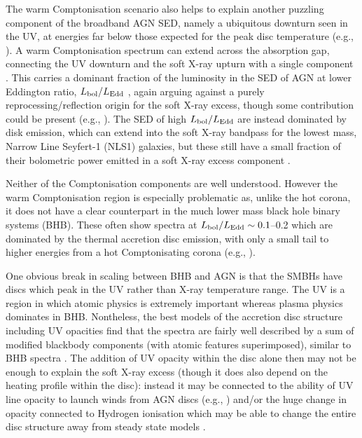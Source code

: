 \documentclass[a4paper,fleqn,usenatbib]{mnras}
\begin{document}
The warm Comptonisation scenario also helps to explain another puzzling
component of the broadband AGN SED, namely a ubiquitous downturn seen
in the UV, at energies far below those expected for the peak disc
temperature (e.g., \citealt{zheng1997,davis2007}).  A warm
Comptonisation spectrum can extend across the absorption gap,
connecting the UV downturn and the soft X-ray upturn with a single
component \citep{elvis1994,laor1997,richards2006}.
This carries a dominant fraction of the luminosity in the
SED of AGN at lower Eddington ratio, $L_{\rm bol}/L_{\rm Edd}$
\citep{jin2012a,jin2012b}, 
again arguing against a purely reprocessing/reflection origin for the soft X-ray excess, though
some contribution could be present 
(e.g., \citealt{lawrence2012}). The SED of high $L_{\rm bol}/L_{\rm Edd}$
are instead dominated by disk emission, which can extend into the soft
X-ray bandpass for the lowest mass, Narrow Line Seyfert-1 (NLS1) galaxies, but
these still have a small fraction of their bolometric power emitted in
a soft X-ray excess component
\citep{jin2012a, jin2012b,done2012,jin2013,matzeu2017}.

Neither of the Comptonisation components are well understood. 
However the warm Comptonisation region is especially problematic as, unlike the hot 
corona, it does not have a clear counterpart in the much lower mass
black hole binary systems (BHB). These often show spectra at $L_{\rm bol}/L_{\rm
  Edd}\sim 0.1$--0.2 which are dominated by the thermal accretion disc
emission, with only a small tail to higher energies from a hot
Comptonisating corona (e.g., \citealt{kubota2001,marek2004a,steiner2009}).

One obvious break in scaling between BHB and AGN is that the
SMBHs have discs which peak in the UV rather than
X-ray temperature range. The UV is a region in which atomic
physics is extremely important whereas plasma physics dominates in
BHB. Nontheless, the best models of the accretion disc structure
including UV opacities
\citep{hubeny2001} find that the spectra
are fairly well described by a sum of modified blackbody components
(with atomic features superimposed), similar to BHB
spectra \citep{davis2006}. The addition of UV opacity within the
disc alone then may not be enough to explain the soft X-ray excess
(though it does also depend on the heating profile within the disc):
instead it may be connected to the ability of UV line opacity to launch winds
from AGN discs  (e.g., \citealt{proga2000,laor2011}) and/or the huge change in
opacity connected to Hydrogen ionisation which may be able to change
the entire disc structure away from steady state models 
\citep{hameury2009}.
\end{document}
